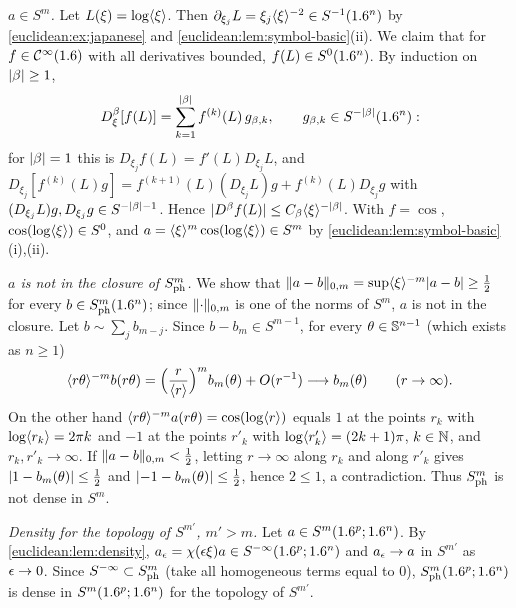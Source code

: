\subsection*{}

\emph{$a\in S^m$.} Let $L(\xi)=\log\langle \xi\rangle$. Then $\partial_{\xi_j}L=\xi_j\langle \xi\rangle^{-2}\in S^{-1}(1.6^n)$ by
\cref{euclidean:ex:japanese} and \cref{euclidean:lem:symbol-basic}(ii). We claim that for
$f\in\mathcal{C}^\infty(1.6)$ with all derivatives bounded, $f(L)\in S^0(1.6^n)$. By induction on
$\lvert \beta\rvert\ge1$,
\begin{equation*}
  D^\beta_\xi[f(L)]=\sum_{k=1}^{\lvert \beta\rvert}f^{(k)}(L)\,g_{\beta,k},\qquad g_{\beta,k}\in S^{-\lvert \beta\rvert}(1.6^n):
\end{equation*}
for $\lvert \beta\rvert=1$ this is $D_{\xi_j}f(L)=f'(L)D_{\xi_j}L$, and
$D_{\xi_j}[f^{(k)}(L)g]=f^{(k+1)}(L)(D_{\xi_j}L)g+f^{(k)}(L)D_{\xi_j}g$ with
$(D_{\xi_j}L)g,D_{\xi_j}g\in S^{-\lvert \beta\rvert-1}$. Hence
$\lvert D^\beta f(L)\rvert\le C_\beta\langle \xi\rangle^{-\lvert \beta\rvert}$. With $f=\cos$,
$\cos(\log\langle \xi\rangle)\in S^0$, and $a=\langle \xi\rangle^m\cos(\log\langle \xi\rangle)\in S^m$ by
\cref{euclidean:lem:symbol-basic}(i),(ii).

\emph{$a$ is not in the closure of $S^{m}_{\mathrm{ph}}$.} We show that
$\lVert a-b\rVert_{0,m}=\sup\langle \xi\rangle^{-m}\lvert a-b\rvert\ge\frac12$ for every $b\in S^{m}_{\mathrm{ph}}(1.6^n)$;
since $\lVert \cdot\rVert_{0,m}$ is one of the norms of $S^m$, $a$ is not in the closure. Let
$b\sim\sum_jb_{m-j}$. Since $b-b_m\in S^{m-1}$, for every $\theta\in\mathbb{S}^{n-1}$ (which
exists as $n\ge1$)
\begin{equation*}
  \langle r\theta\rangle^{-m}b(r\theta)=\Bigl(\frac r{\langle r\rangle}\Bigr)^mb_m(\theta)+O(r^{-1})
  \longrightarrow b_m(\theta)\qquad(r\to\infty).
\end{equation*}
On the other hand $\langle r\theta\rangle^{-m}a(r\theta)=\cos(\log\langle r\rangle)$ equals $1$ at the
points $r_k$ with $\log\langle r_k\rangle=2\pi k$ and $-1$ at the points $r'_k$ with
$\log\langle r'_k\rangle=(2k+1)\pi$, $k\in\mathbb{N}$, and $r_k,r'_k\to\infty$. If
$\lVert a-b\rVert_{0,m}<\frac12$, letting $r\to\infty$ along $r_k$ and along $r'_k$ gives
$\lvert 1-b_m(\theta)\rvert\le\frac12$ and $\lvert -1-b_m(\theta)\rvert\le\frac12$, hence
$2\le1$, a contradiction. Thus $S^{m}_{\mathrm{ph}}$ is not dense in $S^m$.

\emph{Density for the topology of $S^{m'}$, $m'>m$.} Let $a\in S^m(1.6^p;1.6^n)$. By
\cref{euclidean:lem:density}, $a_\epsilon=\chi(\epsilon\xi)a\in S^{-\infty}(1.6^p;1.6^n)$ and
$a_\epsilon\to a$ in $S^{m'}$ as $\epsilon\to0$. Since
$S^{-\infty}\subset S^{m}_{\mathrm{ph}}$ (take all homogeneous terms equal to $0$),
$S^{m}_{\mathrm{ph}}(1.6^p;1.6^n)$ is dense in $S^m(1.6^p;1.6^n)$ for the topology of $S^{m'}$.


